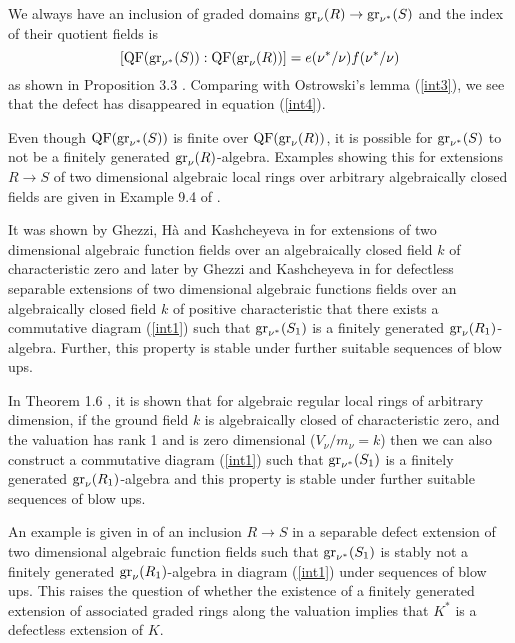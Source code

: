 \documentclass[11pt]{amsart}
\begin{document}
We always have an inclusion of graded domains 
${\rm gr}_{\nu}(R)\rightarrow {\rm gr}_{\nu^*}(S)$ and
the index of their quotient fields is 
\begin{equation}\label{int4}
[{\rm QF}({\rm gr}_{\nu^*}(S)):{\rm QF}({\rm gr}_{\nu}(R))]=e(\nu^*/\nu)f(\nu^*/\nu)
\end{equation}
 as shown in  Proposition 3.3 \cite{C11}. Comparing with Ostrowski's lemma (\ref{int3}), we see that  the defect has disappeared in  equation (\ref{int4}).

Even though  ${\rm QF}({\rm gr}_{\nu^*}(S))$ is finite over ${\rm QF}({\rm gr}_{\nu}(R))$, it is possible for ${\rm gr}_{\nu^*}(S)$ to not be a finitely generated ${\rm gr}_{\nu}(R)$-algebra. Examples showing this for extensions $R\rightarrow S$ of two dimensional algebraic local rings over arbitrary algebraically closed fields are given in Example 9.4 of \cite{CV1}.

It was shown by Ghezzi, H\`a and Kashcheyeva in \cite{GHK} for extensions of two dimensional algebraic function fields over an algebraically closed field $k$ of characteristic zero and later by Ghezzi and Kashcheyeva in \cite{GK} for defectless separable extensions of two dimensional algebraic functions fields over an algebraically closed field $k$ of positive characteristic that there exists a commutative diagram (\ref{int1}) such that
${\rm gr}_{\nu^*}(S_1)$ is a finitely generated ${\rm gr}_{\nu}(R_1)$-algebra. Further, this property is stable under further  suitable  sequences of blow ups. 

 In Theorem 1.6 \cite{C11}, it is shown that for algebraic regular local rings of arbitrary dimension, if the ground field $k$ is algebraically closed of characteristic zero, and the valuation has rank 1 and is zero dimensional ($V_{\nu}/m_{\nu}=k$) then we can also construct a commutative diagram (\ref{int1}) such that
${\rm gr}_{\nu^*}(S_1)$ is a finitely generated ${\rm gr}_{\nu}(R_1)$-algebra and  this property is stable under further  suitable sequences of blow ups.

An example is given in \cite{CP1} of an inclusion $R\rightarrow S$ in a separable defect extension of two dimensional algebraic function fields such that ${\rm gr}_{\nu^*}(S_1)$ is stably not  a finitely generated ${\rm gr}_{\nu}(R_1)$-algebra  in diagram (\ref{int1})
 under sequences of blow ups. This raises the question of whether the existence of a finitely generated extension of associated graded rings along the valuation implies that $K^*$ is a defectless extension of $K$.
\end{document}
